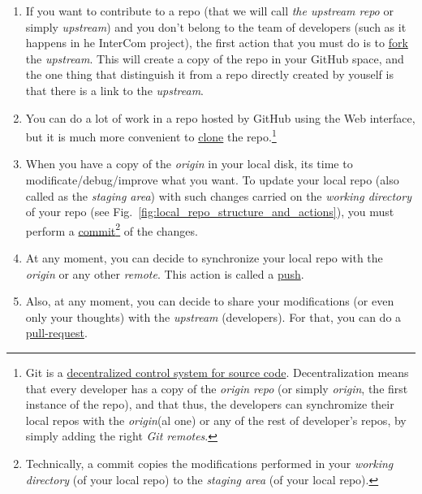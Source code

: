 \begin{enumerate}

\item If you want to contribute to a repo (that we will call \emph{the
upstream repo} or simply \emph{upstream}) \cite{Git-workflow} and you
  don't belong to the team of developers (such as it happens in he
  InterCom project), the first action that you must do is to
  \href{https://docs.github.com/en/github/getting-started-with-github/fork-a-repo}{fork}
  the \emph{upstream}. This will create a copy of the repo in your
  GitHub space, and the one thing that distinguish it from a repo
  directly created by youself is that there is a link to the
  \emph{upstream}.

\item You can do a lot of work in a repo hosted by GitHub using the
  Web interface, but it is much more convenient to
  \href{https://docs.github.com/en/github/creating-cloning-and-archiving-repositories/cloning-a-repository}{clone}
  the repo.\footnote{Git is a
  \href{https://nvie.com/posts/a-successful-git-branching-model/}{decentralized
    control system for source code}. Decentralization means that every
  developer has a copy of the \emph{origin repo} (or simply
  \emph{origin}, the first instance of the repo), and that thus, the
  developers can synchromize their local repos with the
  \emph{origin}(al one) or any of the rest of developer's repos, by
  simply adding the right \emph{Git remotes}.}

\item When you have a copy of the \emph{origin} in your local disk,
  its time to modificate/debug/improve what you want. To update your
  local repo (also called as the \emph{staging area}) with such
  changes carried on the \emph{working directory} of your repo (see
  Fig.~\ref{fig:local_repo_structure_and_actions}), you must perform a
  \href{https://docs.github.com/en/github/getting-started-with-github/github-glossary#commit}{commit}\footnote{Technically,
  a commit copies the modifications performed in your \emph{working
  directory} (of your local repo) to the \emph{staging area} (of your
  local repo).} of the changes.
\item At any moment, you can decide to synchronize your local repo
  with the \emph{origin} or any other \emph{remote}. This action is
  called a
  \href{https://docs.github.com/en/github/using-git/pushing-commits-to-a-remote-repository}{push}.
\item Also, at any moment, you can decide to share your modifications
  (or even only your thoughts) with the \emph{upstream}
  (developers). For that, you can do a
  \href{https://docs.github.com/en/github/collaborating-with-issues-and-pull-requests/about-pull-requests}{pull-request}.
\end{enumerate}

